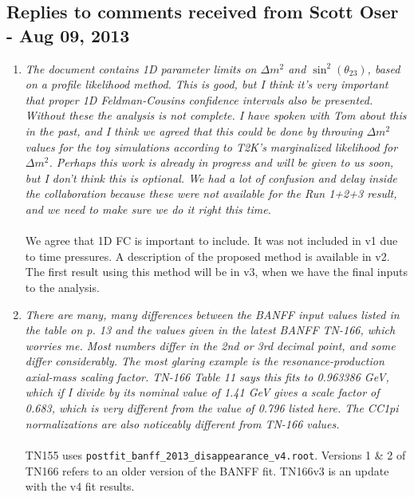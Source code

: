 \subsection{
  Replies to comments received from Scott Oser - Aug 09, 2013 }

\begin{enumerate}

  \vspace{5 mm}
\item
  {\em
    The document contains 1D parameter limits on $\Delta m^2$ and $\sin^2(\theta_{23})$, based on a profile likelihood method.
    This is good, but I think it's very important that proper 1D Feldman-Cousins confidence intervals also be presented.
    Without these the analysis is not complete.  I have spoken with Tom about this in the past, and I think we agreed that
    this could be done by throwing $\Delta m^2$ values for the toy simulations according to T2K's marginalized likelihood for
    $\Delta m^2$. Perhaps this work is already in progress and will be given to us soon, but I don't think this is optional.
    We had a lot of confusion and delay inside the collaboration because these were not available for the Run 1+2+3 result,
    and we need to make sure we do it right this time.
  }\\
  \\
  We agree that 1D FC is important to include. It was not included in v1 due to time pressures.
  A description of the proposed method is available in v2.
  The first result using this method will be in v3, when we have the
  final inputs to the analysis.
  

  \vspace{5 mm}
\item
  {\em
    There are many, many differences between the BANFF input values listed in the table on p. 13 and the values given
    in the latest BANFF TN-166, which worries me.  Most numbers differ in the 2nd or 3rd decimal point, and some differ
    considerably.  The most glaring example is the resonance-production axial-mass scaling factor.  TN-166 Table 11 says
    this fits to 0.963386 GeV, which if I divide by its nominal value of 1.41 GeV gives a scale factor of 0.683, which is
    very different from the value of 0.796 listed here.  The CC1pi normalizations are also noticeably different from TN-166 values.  
  }\\
  \\
  TN155 uses \verb+postfit_banff_2013_disappearance_v4.root+. Versions 1 \& 2 of TN166 refers to an older
  version of the BANFF fit. TN166v3 is an update with the v4 fit results.


\end{enumerate}
